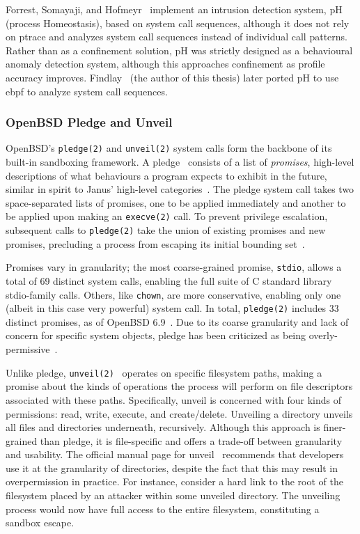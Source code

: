 Forrest, Somayaji, and Hofmeyr~\cite{forrest1996_sense_of_self} implement an intrusion
detection system, pH (process Homeostasis), based on system call sequences, although it
does not rely on ptrace and analyzes system call sequences instead of individual call
patterns. Rather than as a confinement solution, pH was strictly designed as a behavioural
anomaly detection system, although this approaches confinement as profile accuracy
improves.  Findlay~\cite{findlay2020_ebph} (the author of this thesis) later ported pH to
use \gls{ebpf} to analyze system call sequences.

\subsubsection*{OpenBSD Pledge and Unveil}
\label{sss:pledge}

OpenBSD's \texttt{pledge(2)} and \texttt{unveil(2)} system calls form the backbone of its
built-in sandboxing framework. A pledge~\cite{pledge} consists of a list of
\textit{promises}, high-level descriptions of what behaviours a program expects to exhibit
in the future, similar in spirit to Janus' high-level categories~\cite{goldberg96_janus,
wagner1999_janus}. The pledge system call takes two space-separated lists of promises, one
to be applied immediately and another to be applied upon making an \texttt{execve(2)}
call. To prevent privilege escalation, subsequent calls to \texttt{pledge(2)} take the
union of existing promises and new promises, precluding a process from escaping its
initial bounding set~\cite{pledge}.

Promises vary in granularity; the most coarse-grained promise, \texttt{stdio}, allows
a total of 69 distinct system calls, enabling the full suite of C standard library
stdio-family calls. Others, like \texttt{chown}, are more conservative, enabling only one
(albeit in this case very powerful) system call. In total, \texttt{pledge(2)} includes 33
distinct promises, as of OpenBSD 6.9~\cite{pledge}. Due to its coarse granularity and lack
of concern for specific system objects, pledge has been criticized as being
overly-permissive~\cite{anderson2017_comparison}.

Unlike pledge, \texttt{unveil(2)}~\cite{unveil, corbet2018_unveil} operates on specific
filesystem paths, making a promise about the kinds of operations the process will perform
on file descriptors associated with these paths. Specifically, unveil is concerned with
four kinds of permissions: read, write, execute, and create/delete. Unveiling a directory
unveils all files and directories underneath, recursively. Although this approach is
finer-grained than pledge, it is file-specific and offers a trade-off between granularity
and usability. The official manual page for unveil~\cite{unveil} recommends that
developers use it at the granularity of directories, despite the fact that this may result
in overpermission in practice. For instance, consider a hard link to the root of the
filesystem placed by an attacker within some unveiled directory. The unveiling process
would now have full access to the entire filesystem, constituting a sandbox escape.

